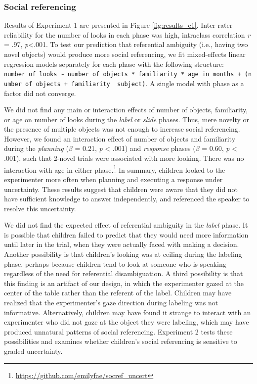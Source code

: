 \documentclass[a4paper,man,apacite,floatsintext]{apa6}
\begin{document}
\subsubsection{Social referencing}\label{social-referencing}

Results of Experiment 1 are presented in Figure \ref{fig:results_e1}.
Inter-rater reliability for the number of looks in each phase was high,
intraclass correlation \emph{r} = .97, \emph{p}\textless{}.001. To test
our prediction that referential ambiguity (i.e., having two novel
objects) would produce more social referencing, we fit mixed-effects
linear regression models separately for each phase with the following
structure:
\texttt{number\ of\ looks\ \textasciitilde{}\ number\ of\ objects\ *\ familiarity\ *\ age\ in\ months\ +\ (number\ of\ objects\ +\ familiarity\ \textbar{}\ subject)}.
A single model with phase as a factor did not converge.

We did not find any main or interaction effects of number of objects,
familiarity, or age on number of looks during the \emph{label} or
\emph{slide} phases. Thus, mere novelty or the presence of multiple
objects was not enough to increase social referencing. However, we found
an interaction effect of number of objects and familiarity during the
\emph{planning} (\(\beta\) = 0.21, \emph{p} \textless{} .001) and
\emph{response} phases (\(\beta\) = 0.60, \emph{p} \textless{} .001),
such that 2-novel trials were associated with more looking. There was no
interaction with age in either phase.\footnote{\url{https://github.com/emilyfae/socref_uncert}}
In summary, children looked to the experimenter more often when planning
and executing a response under uncertainty. These results suggest that
children were aware that they did not have sufficient knowledge to
answer independently, and referenced the speaker to resolve this
uncertainty.

We did not find the expected effect of referential ambiguity in the
\emph{label} phase. It is possible that children failed to predict that
they would need more information until later in the trial, when they
were actually faced with making a decision. Another possibility is that
children's looking was at ceiling during the labeling phase, perhaps
because children tend to look at someone who is speaking regardless of
the need for referential disambiguation. A third possibility is that
this finding is an artifact of our design, in which the experimenter
gazed at the center of the table rather than the referent of the label.
Children may have realized that the experimenter's gaze direction during
labeling was not informative. Alternatively, children may have found it
strange to interact with an experimenter who did not gaze at the object
they were labeling, which may have produced unnatural patterns of social
referencing. Experiment 2 tests these possibilities and examines whether
children's social referencing is sensitive to graded uncertainty.
\end{document}
